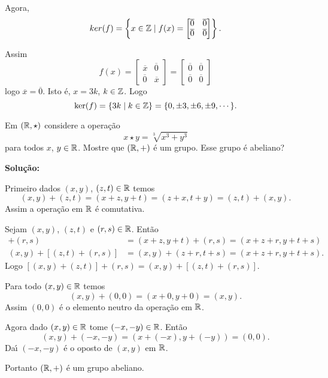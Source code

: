 \documentclass[12pt]{exam}
\begin{document}
Agora,
\[
	ker(f) = \left\{x \in \mathbb{Z} \mid f(x) = \begin{bmatrix}
		\overline{0} & \overline{0}\\
		\overline{0} & \overline{0}
	\end{bmatrix}\right\}.
\]

Assim
\[
	f(x) = \begin{bmatrix}
		\overline{x} & \overline{0}\\
		\overline{0} & \overline{x}
	\end{bmatrix} = \begin{bmatrix}
		\overline{0} & \overline{0}\\
		\overline{0} & \overline{0}
	\end{bmatrix}
\]
logo $\overline{x} = \overline{0}$. Isto \'e, $x = 3k$, $k \in \mathbb{Z}$. Logo 
\[
	\ker(f) = \{3k \mid k \in \mathbb{Z}\} = \{0, \pm 3, \pm 6, \pm 9, \cdots\}.
\]

\vspace{1cm}

\questao{} Em $(\mathbb{R} , \star)$ considere a opera\c{c}\~ao
\[
	x\star y = \sqrt[3]{x^3 + y^3}
\]
para todos $x$, $y \in \mathbb{R}$. Mostre que $(\mathbb{R}, +)$ \'e um grupo. Esse grupo é abeliano?

\noindent\textbf{Solu\c{c}\~ao:}

Primeiro dados $(x,y)$, $(z,t) \in \mathbb{R}$ temos
\[
	(x,y) + (z,t) = (x+z,y+t) = (z+x,t+y) = (z,t) + (x,y).
\]
Assim a opera\c{c}\~ao em $\mathbb{R}$ \'e comutativa.

Sejam $(x,y)$, $(z,t)$ e $(r,s) \in \mathbb{R}$. Ent\~ao
\begin{align*}
	[(x,y) + (z,t)] + (r,s) &= (x + z, y+t) + (r,s) = (x+z+r,y+t+s)\\
	(x,y) + [(z,t)+(r,s)] &= (x,y) + (z+r,t+s) = (x+z+r,y+t+s).
\end{align*}
Logo $[(x,y)+(z,t)] + (r,s) = (x,y) + [(z,t) + (r,s)]$.

Para todo $(x,y) \in \mathbb{R}$ temos
\[
	(x,y) + (0,0) = (x+0,y+0) = (x,y).
\]
Assim $(0,0)$ \'e o elemento neutro da opera\c{c}\~ao em $\mathbb{R}$.

Agora dado $(x,y) \in \mathbb{R}$ tome $(-x,-y) \in \mathbb{R}$. Ent\~ao
\[
	(x,y) + (-x,-y) = (x+(-x),y+(-y)) = (0,0).
\]
Da{\'\i} $(-x,-y)$ \'e o oposto de $(x,y)$ em $\mathbb{R}$.

Portanto $(\mathbb{R},+)$ \'e um grupo abeliano.
\end{document}
